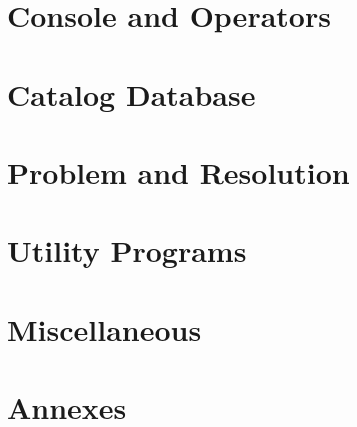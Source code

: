 \documentclass[10pt,a4paper]{book}
\begin{document}
\part{Console and Operators}
\setcounter{chapter}{0}
 


\part{Catalog Database}
\setcounter{chapter}{0}





\part{Problem and Resolution}
\setcounter{chapter}{0}






\part{Utility Programs}
\setcounter{chapter}{0}




\part{Miscellaneous}
\setcounter{chapter}{0}






\part{Annexes}
\setcounter{chapter}{0}









\clearpage
\printindex[general]
\printindex[dir]
\printindex[fd]
\printindex[sd]
\printindex[console]
\end{document}
